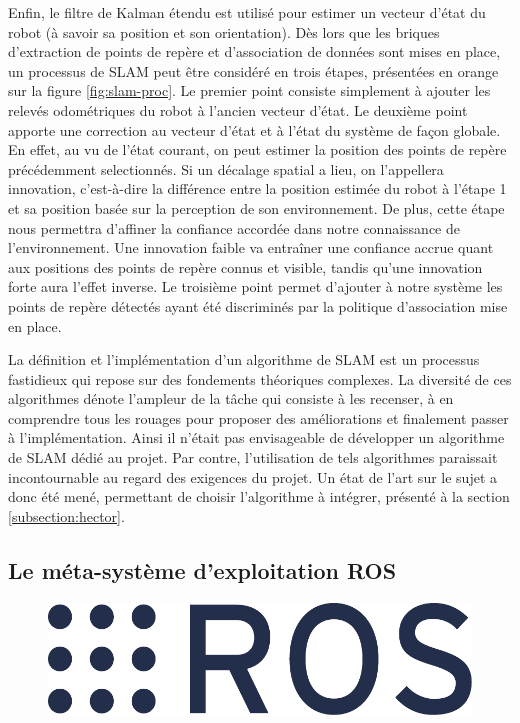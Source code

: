 Enfin, le filtre de Kalman étendu est utilisé pour estimer un vecteur d'état du robot (à savoir sa position et son orientation).
Dès lors que les briques d'extraction de points de repère et d'association de données sont mises en place, un processus de SLAM peut être considéré en trois étapes, présentées en orange sur la figure \ref{fig:slam-proc}. 
Le premier point consiste simplement à ajouter les relevés odométriques du robot à l'ancien vecteur d'état. 
Le deuxième point apporte une correction au vecteur d'état et à l'état du système de façon globale.
En effet, au vu de l'état courant, on peut estimer la position des points de repère précédemment selectionnés.
Si un décalage spatial a lieu, on l'appellera innovation, c'est-à-dire la différence entre la position estimée du robot à l'étape 1 et sa position basée sur la perception de son environnement.
De plus, cette étape nous permettra d'affiner la confiance accordée dans notre connaissance de l'environnement. 
Une innovation faible va entraîner une confiance accrue quant aux positions des points de repère connus et visible, tandis qu'une innovation forte aura l'effet inverse.
Le troisième point permet d'ajouter à notre système les points de repère détectés ayant été discriminés par la politique d'association mise en place. 

La définition et l'implémentation d'un algorithme de SLAM est un processus fastidieux qui repose sur des fondements théoriques complexes. 
La diversité de ces algorithmes\cite{Bib_openslam} dénote l'ampleur de la tâche qui consiste à les recenser, à en comprendre tous les rouages pour proposer des améliorations et finalement passer à l'implémentation. 
Ainsi il n'était pas envisageable de développer un algorithme de SLAM dédié au projet. 
Par contre, l'utilisation de tels algorithmes paraissait incontournable au regard des exigences du projet. 
Un état de l'art sur le sujet a donc été mené, permettant de choisir l'algorithme à intégrer, présenté à la section \ref{subsection:hector}. 

  \subsection{Le méta-système d'exploitation ROS}

\begin{figure}[h]
  \centering
    \includegraphics[width=.2\linewidth]{figures/ros_logo}  
  \label{fig:ros}
\end{figure} 
  
